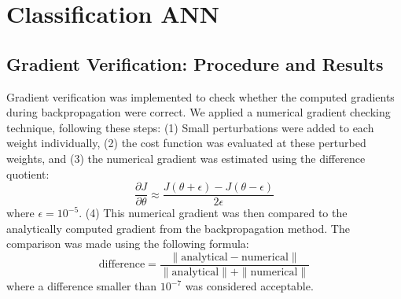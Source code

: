 \documentclass[fleqn,moreauthors,10pt]{ds_report}
\begin{document}
%
\raggedbottom

\maketitle

\thispagestyle{empty} 





\section{Classification ANN}

\subsection{Gradient Verification: Procedure and Results}
Gradient verification was implemented to check whether the computed gradients during backpropagation were correct. We applied a numerical gradient checking technique, following these steps:
(1) Small perturbations were added to each weight individually, (2) the cost function was evaluated at these perturbed weights, and (3) the numerical gradient was estimated using the difference quotient:
\[
    \frac{\partial J}{\partial \theta} \approx \frac{J(\theta + \epsilon) - J(\theta - \epsilon)}{2\epsilon}
\]
where \(\epsilon = 10^{-5}\).
(4) This numerical gradient was then compared to the analytically computed gradient from the backpropagation method.
The comparison was made using the following formula:
\[
\text{difference} = \frac{\| \text{analytical} - \text{numerical} \|}{\| \text{analytical} \| + \| \text{numerical} \|}
\]
where a difference smaller than \(10^{-7}\) was considered acceptable.
\end{document}
